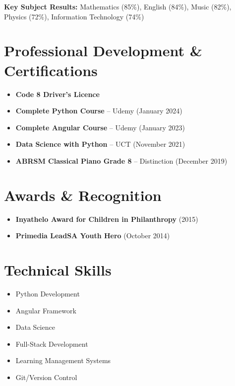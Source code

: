 \documentclass[11pt,a4paper]{article}
\begin{document}
\textbf{Key Subject Results:} Mathematics (85\%), English (84\%), Music (82\%), Physics (72\%), Information Technology (74\%)

\section*{Professional Development \& Certifications}

\begin{itemize}[leftmargin=*, itemsep=0pt]
    \item \textbf{Code 8 Driver's Licence}
    \item \textbf{Complete Python Course} -- Udemy (January 2024)
    \item \textbf{Complete Angular Course} -- Udemy (January 2023)
    \item \textbf{Data Science with Python} -- UCT (November 2021)
    \item \textbf{ABRSM Classical Piano Grade 8} -- Distinction (December 2019)
\end{itemize}

\section*{Awards \& Recognition}

\begin{itemize}[leftmargin=*, itemsep=0pt]
    \item \textbf{Inyathelo Award for Children in Philanthropy} (2015)
    \item \textbf{Primedia LeadSA Youth Hero} (October 2014)
\end{itemize}

\section*{Technical Skills}

\begin{multicols}{2}
\begin{itemize}[leftmargin=*, itemsep=0pt]
    \item Python Development
    \item Angular Framework
    \item Data Science
    \item Full-Stack Development
    \item Learning Management Systems
    \item Git/Version Control
\end{itemize}
\end{multicols}
\end{document}
